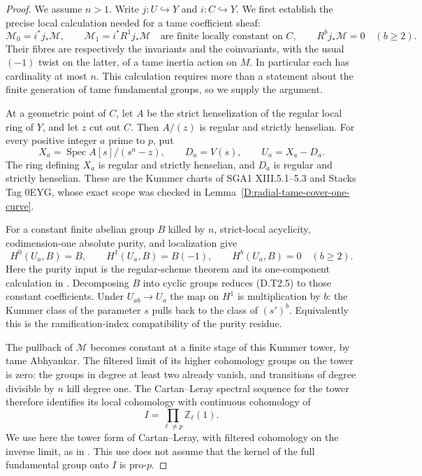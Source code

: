 \begin{proof}
We assume $n>1$. Write $j:U\hookrightarrow Y$ and
$i:C\hookrightarrow Y$. We first establish the precise
local calculation needed for a tame coefficient sheaf:
\[
 \mathcal M_0=i^*j_*\mathcal M,\qquad
 \mathcal M_1=i^*R^1j_*\mathcal M
 \quad\text{are finite locally constant on }C,
 \qquad R^bj_*\mathcal M=0\quad(b\geq2).
                                                        \tag{D.T2.3}
\]
Their fibres are respectively the invariants and the
coinvariants, with the usual $(-1)$ twist on the latter,
of a tame inertia action on $M$. In particular each has
cardinality at most $n$. This calculation requires more
than a statement about the finite generation of tame
fundamental groups, so we supply the argument.

At a geometric point of $C$, let $A$ be the strict
henselization of the regular local ring of $Y$, and let
$z$ cut out $C$. Then $A/(z)$ is regular and strictly
henselian. For every positive integer $a$ prime to $p$,
put
\[
 X_a=\operatorname{Spec}A[s]/(s^a-z),\qquad
 D_a=V(s),\qquad U_a=X_a-D_a.
                                                        \tag{D.T2.4}
\]
The ring defining $X_a$ is regular and strictly
henselian, and $D_a$ is regular and strictly henselian.
These are the Kummer charts of SGA1 XIII.5.1--5.3 and
Stacks Tag 0EYG, whose exact scope was checked in
Lemma~\ref{D:radial-tame-cover-one-curve}.

For a constant finite abelian group $B$ killed by $n$,
strict-local acyclicity, codimension-one absolute purity,
and localization give
\[
 H^0(U_a,B)=B,\qquad H^1(U_a,B)=B(-1),\qquad
                    H^b(U_a,B)=0\quad(b\geq2).
                                                        \tag{D.T2.5}
\]
Here the purity input is the regular-scheme theorem and
its one-component calculation in
\citet[Expose XVI, Theorem 3.1.1 and
Corollary 3.1.3]{A_ILO2014}. Decomposing $B$ into cyclic
groups reduces (D.T2.5) to those constant coefficients.
Under $U_{ab}\to U_a$ the map on $H^1$ is multiplication
by $b$: the Kummer class of the parameter $s$ pulls back
to the class of $(s')^b$. Equivalently this is the
ramification-index compatibility of the purity residue.

The pullback of $\mathcal M$ becomes constant at a
finite stage of this Kummer tower, by tame Abhyankar.
The filtered limit of its higher cohomology groups on
the tower is zero: the groups in degree at least two
already vanish, and transitions of degree divisible
by $n$ kill degree one. The Cartan--Leray spectral
sequence for the tower therefore identifies its local
cohomology with continuous cohomology of
\[
                   I=\prod_{\ell\ne p}\mathbb Z_\ell(1).
                                                        \tag{D.T2.6}
\]
We use here the tower form of Cartan--Leray, with
filtered cohomology on the inverse limit, as in
\citet[Theorem 14.9 and Remark 14.10, pp.~96--97]
{MilneLEC2013H2D}. This use does not assume that the
kernel of the full fundamental group onto $I$ is
pro-$p$.


\end{proof}
